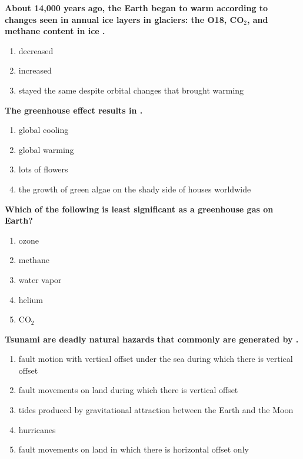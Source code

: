 \item {
\setlength{\itemsep}{0cm}
\setlength{\parskip}{.2cm}
\begin{samepage}
\textbf{
About 14,000 years ago, the Earth began to warm according to changes seen in annual ice layers in glaciers: the O18, CO\ensuremath{_2}, and methane content in ice \makebox[1cm]{\Rivpt\hrulefill\Rivpt}.
}
\begin{enumerate}
\item {  decreased }
\item {  increased }
\item {  stayed the same despite orbital changes that brought warming }
\end{enumerate}
\end{samepage}
}
\item {
\setlength{\itemsep}{0cm}
\setlength{\parskip}{.2cm}
\begin{samepage}
\textbf{
The greenhouse effect results in \makebox[1cm]{\Rivpt\hrulefill\Rivpt}.
}
\begin{enumerate}
\item {  global cooling }
\item {  global warming }
\item {  lots of flowers }
\item {  the growth of green algae on the shady side of houses worldwide }
\end{enumerate}
\end{samepage}
}
\item {
\setlength{\itemsep}{0cm}
\setlength{\parskip}{.2cm}
\begin{samepage}
\textbf{
Which of the following is least significant as a greenhouse gas on Earth?
}
\begin{enumerate}
\item {  ozone }
\item {  methane }
\item {  water vapor }
\item {  helium }
\item {  CO\ensuremath{_2} }
\end{enumerate}
\end{samepage}
}
\item {
\setlength{\itemsep}{0cm}
\setlength{\parskip}{.2cm}
\begin{samepage}
\textbf{
Tsunami are deadly natural hazards that commonly are generated by \makebox[1cm]{\Rivpt\hrulefill\Rivpt}.
}
\begin{enumerate}
\item { 	fault motion with vertical offset under the sea during which there is vertical offset }
\item { 	fault movements on land during which there is vertical offset }
\item { 	tides produced by gravitational attraction between the Earth and the Moon }
\item { 	hurricanes }
\item { 	fault movements on land in which there is horizontal offset only 		 }
\end{enumerate}
\end{samepage}
}
